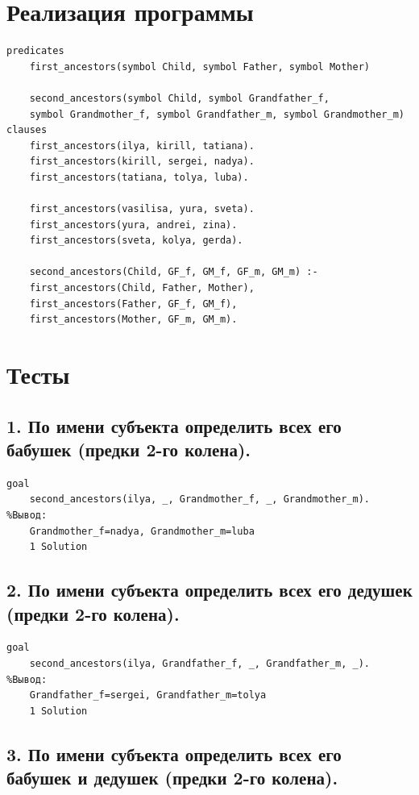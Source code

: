 \documentclass[a4paper,12pt]{article}
\begin{document}
	\newpage
	
	\section*{Реализация программы}
	
	\begin{verbatim}
predicates
	first_ancestors(symbol Child, symbol Father, symbol Mother)
	
	second_ancestors(symbol Child, symbol Grandfather_f, 
	symbol Grandmother_f, symbol Grandfather_m, symbol Grandmother_m)
clauses
	first_ancestors(ilya, kirill, tatiana).
	first_ancestors(kirill, sergei, nadya).
	first_ancestors(tatiana, tolya, luba).
	
	first_ancestors(vasilisa, yura, sveta).
	first_ancestors(yura, andrei, zina).
	first_ancestors(sveta, kolya, gerda).

	second_ancestors(Child, GF_f, GM_f, GF_m, GM_m) :- 
	first_ancestors(Child, Father, Mother),
	first_ancestors(Father, GF_f, GM_f), 
	first_ancestors(Mother, GF_m, GM_m).
	\end{verbatim}
	
	\section*{Тесты}
	
	\subsection*{1.	По имени субъекта определить всех его бабушек (предки 2-го колена).}
	
	\begin{verbatim}
goal
	second_ancestors(ilya, _, Grandmother_f, _, Grandmother_m).
%Вывод:
	Grandmother_f=nadya, Grandmother_m=luba
	1 Solution
	\end{verbatim}
	
	\subsection*{2. По имени субъекта определить всех его дедушек (предки 2-го колена).}
	
	\begin{verbatim}
goal
	second_ancestors(ilya, Grandfather_f, _, Grandfather_m, _).
%Вывод:
	Grandfather_f=sergei, Grandfather_m=tolya
	1 Solution
	\end{verbatim}
	
	\subsection*{3. По имени субъекта определить всех его бабушек и дедушек (предки 2-го колена).}
	
\end{document}

